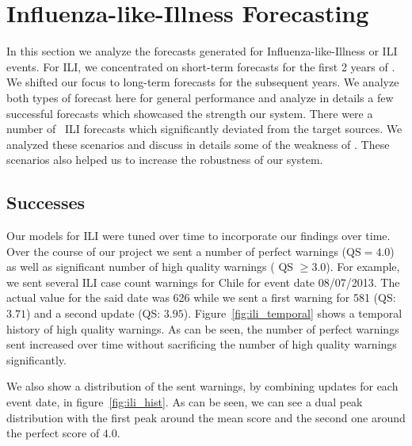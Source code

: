 \section{Influenza-like-Illness Forecasting}
In this section we analyze the forecasts generated for Influenza-like-Illness
or ILI events. For ILI, we concentrated on short-term forecasts for the first
2 years of \EMBERS. We shifted our focus to long-term forecasts for the subsequent
years. We analyze both types of forecast here for general performance and
analyze in details a few successful forecasts which showcased the strength
our system. There were a number of \EMBERS~ILI forecasts which significantly
deviated from the target sources. We analyzed these scenarios and discuss in
details some of the weakness of \EMBERS. These scenarios also helped us to
increase the robustness of our system.


\subsection{Successes}
Our models for ILI were tuned over time to incorporate our findings over time.
Over the course of our project we sent a number of perfect warnings (QS$=4.0$)
as well as significant number of high quality warnings ( QS $\geq 3.0$). For
example, we sent several ILI case count warnings for Chile for event date
08/07/2013. The actual value for the said date was 626 while we sent a first
warning for 581 (QS: $3.71$) and a second update (QS: $3.95$).
Figure~\ref{fig:ili_temporal} shows a temporal history of high quality warnings.
As can be seen, the number of perfect warnings sent increased over time without
sacrificing the number of high quality warnings significantly.

We also show a distribution of the sent warnings, by combining updates for
each event date, in figure~\ref{fig:ili_hist}. As can be seen, we can see a
dual peak distribution with the first peak around the mean score and the second
one around the perfect score of $4.0$.


